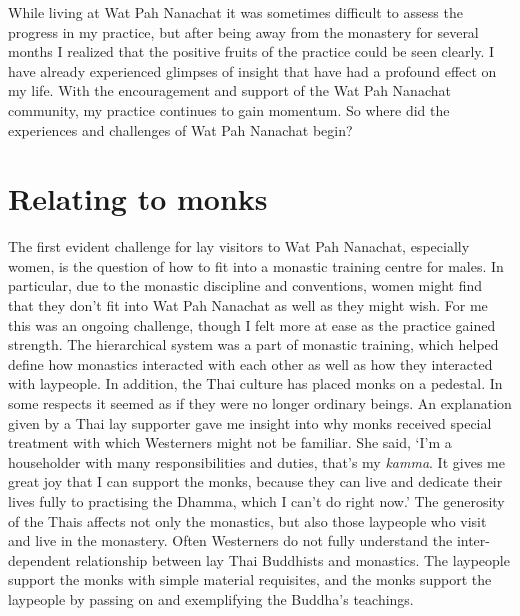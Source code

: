 While living at Wat Pah Nanachat it was sometimes difficult to assess
the progress in my practice, but after being away from the monastery for
several months I realized that the positive fruits of the practice could
be seen clearly. I have already experienced glimpses of insight that
have had a profound effect on my life. With the encouragement and
support of the Wat Pah Nanachat community, my practice continues to gain
momentum. So where did the experiences and challenges of Wat Pah
Nanachat begin? 

\section{Relating to monks}

The first evident challenge for lay visitors to Wat Pah Nanachat, 
especially women, is the question of how to fit into a monastic training
centre for males. In particular, due to the monastic discipline and
conventions, women might find that they don't fit into Wat Pah Nanachat
as well as they might wish. For me this was an ongoing challenge, though
I felt more at ease as the practice gained strength. The hierarchical
system was a part of monastic training, which helped define how
monastics interacted with each other as well as how they interacted with
laypeople. In addition, the Thai culture has placed monks on a pedestal. 
In some respects it seemed as if they were no longer ordinary beings. An
explanation given by a Thai lay supporter gave me insight into why monks
received special treatment with which Westerners might not be familiar. 
She said, `I'm a householder with many responsibilities and duties, 
that's my \emph{kamma}. It gives me great joy that I can support the
monks, because they can live and dedicate their lives fully to
practising the Dhamma, which I can't do right now.' The generosity of
the Thais affects not only the monastics, but also those laypeople who
visit and live in the monastery. Often Westerners do not fully
understand the inter-dependent relationship between lay Thai Buddhists
and monastics. The laypeople support the monks with simple material
requisites, and the monks support the laypeople by passing on and
exemplifying the Buddha's teachings. 

